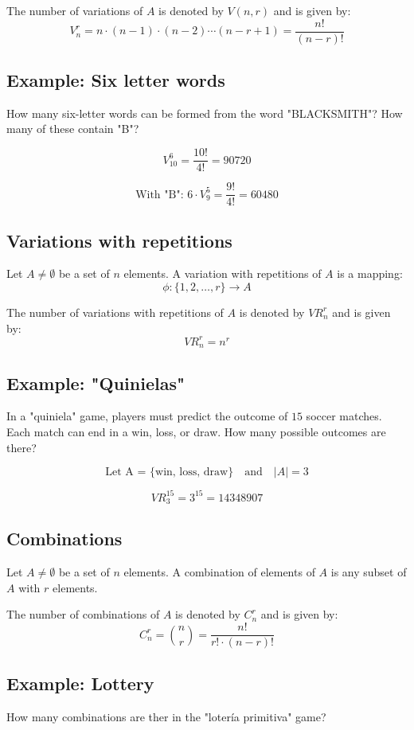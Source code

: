 \documentclass[11pt]{article}
\begin{document}
The number of variations of $A$ is denoted by $V(n,r)$ and is given by:
\[
V_n^r = n \cdot (n - 1) \cdot (n - 2) \cdots (n - r + 1) = \frac{n!}{(n - r)!}
\]

\subsection*{Example: Six letter words}
How many six-letter words can be formed from the word "BLACKSMITH"?
How many of these contain "B"?

\[
V_{10}^6 = \frac{10!}{4!} = 90720
\]

\[
\text{With "B": } 6 \cdot V_9^5 = \frac{9!}{4!} = 60480
\]

\subsection{Variations with repetitions}
Let $A \neq \emptyset$ be a set of $n$ elements. A variation with repetitions of $A$ is a mapping:
\[
\phi: \{1,2,\dots ,r\} \rightarrow A
\]

The number of variations with repetitions of $A$ is denoted by $VR_n^r$ and is given by:
\[
VR_n^r = n^r
\]

\subsection*{Example: "Quinielas"}
In a "quiniela" game, players must predict the outcome of $15$ soccer matches. Each match can end in a win, loss, or draw. How many possible outcomes are there?

\[
\text{Let A = \{win, loss, draw\}} \quad \text{and} \quad |A| = 3
\]

\[
VR_3^{15} = 3^{15} = 14348907
\]

\subsection{Combinations}
Let $A \neq \emptyset$ be a set of $n$ elements. A combination of elements of $A$ is any subset of $A$ with $r$ elements.

The number of combinations of $A$ is denoted by $C_n^r$ and is given by:
\[
C_n^r = \binom{n}{r} = \frac{n!}{r! \cdot (n - r)!}
\]

\subsection*{Example: Lottery}
How many combinations are ther in the "lotería primitiva" game?
\end{document}

